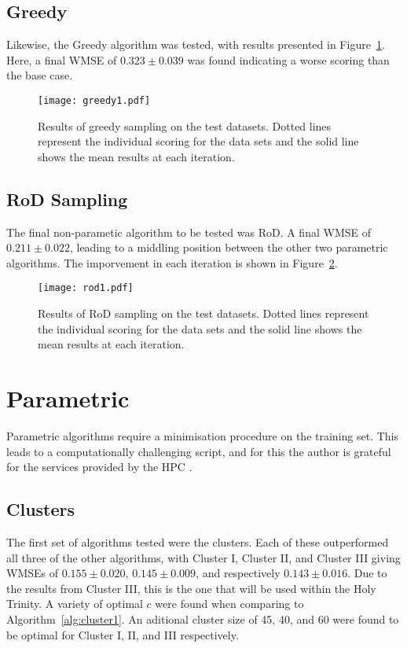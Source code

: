 \subsection{Greedy}
Likewise, the Greedy algorithm was tested, with results presented in Figure~\ref{fig:GreedyTestSet}. Here, a final WMSE of ${0.323\pm{}0.039}$ was found indicating a worse scoring than the base case.
\begin{figure}[H]
    \begin{center}
        \texttt{[image: greedy1.pdf]}
        \caption[Greedy]{Results of greedy sampling on the test datasets. Dotted lines represent the individual scoring for the data sets and the solid line shows the mean results at each iteration.}
        \label{fig:GreedyTestSet}
    \end{center}
\end{figure}

\subsection{RoD Sampling}
The final non-parametic algorithm to be tested was RoD. A final WMSE of ${0.211\pm{}0.022}$, leading to a middling position between the other two parametric algorithms. The imporvement in each iteration is shown in Figure~\ref{fig:RODTestSet}.

\begin{figure}[H]
    \begin{center}
        \texttt{[image: rod1.pdf]}
        \caption[RoD]{Results of RoD sampling on the test datasets. Dotted lines represent the individual scoring for the data sets and the solid line shows the mean results at each iteration.}
        \label{fig:RODTestSet}
    \end{center}
\end{figure}

\section{Parametric}
Parametric algorithms require a minimisation procedure on the training set. This leads to a computationally challenging script, and for this the author is grateful for the services provided by the HPC \cite{HPC}.

\subsection{Clusters}
The first set of algorithms tested were the clusters. Each of these outperformed all three of the other algorithms, with Cluster I, Cluster II, and Cluster III giving WMSEs of ${0.155\pm{}0.020}$, ${0.145\pm{}0.009}$, and respectively ${0.143\pm{}0.016}$. Due to the results from Cluster III, this is the one that will be used within the Holy Trinity. A variety of optimal ${c}$ were found when comparing to Algorithm~\ref{alg:cluster1}. An aditional cluster size of 45, 40, and 60 were found to be optimal for Cluster I, II, and III respectively.

